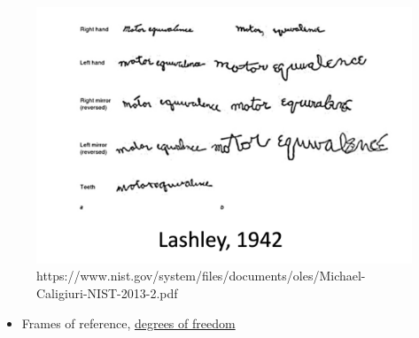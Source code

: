 \documentclass[
  letterpaper,
  DIV=11,
  numbers=noendperiod]{scrartcl}
\providecommand{\tightlist}{%
  \setlength{\itemsep}{0pt}\setlength{\parskip}{0pt}}\usepackage{longtable,booktabs,array}
\begin{document}
\begin{figure}[H]

{\centering \includegraphics{../include/img/calliguri-motor-equivalance.png}

}

\caption{https://www.nist.gov/system/files/documents/oles/Michael-Caligiuri-NIST-2013-2.pdf}

\end{figure}%

\begin{itemize}
\tightlist
\item
  Frames of reference,
  \href{https://en.wikipedia.org/wiki/Degrees_of_freedom_problem\#}{degrees
  of freedom}
\end{itemize}
\end{document}
